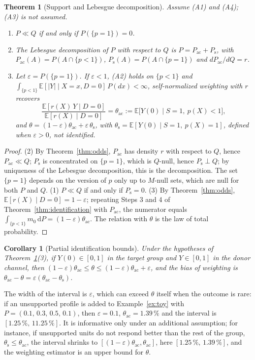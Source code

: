 \documentclass[11pt,a4paper]{article}
\newcommand{\E}{\mathbb{E}}
\newcommand{\dd}{\,\mathrm{d}}
\newcommand{\Pac}{P_{\mathrm{ac}}}
\newcommand{\Ps}{P_{\mathrm{s}}}
\newcommand{\thac}{\theta_{\mathrm{ac}}}
\newcommand{\ths}{\theta_{\mathrm{s}}}
\theoremstyle{plain}
\newtheorem{theorem}{Theorem}
\newtheorem{corollary}{Corollary}
\theoremstyle{definition}
\begin{document}
\begin{theorem}[Support and Lebesgue decomposition]\label{thm:lebesgue}
Assume (A1) and (A4); (A3) is not assumed.
\begin{enumerate}
  \item $P\ll Q$ if and only if $P(\{p=1\})=0$.
  \item The Lebesgue decomposition of $P$ with respect to $Q$ is $P=\Pac+\Ps$, with $\Pac(A)=P(A\cap\{p<1\})$, $\Ps(A)=P(A\cap\{p=1\})$ and $d\Pac/dQ=r$.
  \item Let $\varepsilon=P(\{p=1\})$. If $\varepsilon<1$, (A2) holds on $\{p<1\}$ and $\int_{\{p<1\}}\E[|Y|\mid X=x,D=0]\,P(dx)<\infty$, self-normalized weighting with $r$ recovers
  \[
  \frac{\E[r(X)\,Y\mid D=0]}{\E[r(X)\mid D=0]}=\thac:=\E\bigl[Y(0)\mid S=1,\ p(X)<1\bigr],
  \]
  and $\theta=(1-\varepsilon)\thac+\varepsilon\,\ths$, with $\ths=\E[Y(0)\mid S=1,\ p(X)=1]$, defined when $\varepsilon>0$, not identified.
\end{enumerate}
\end{theorem}
\begin{proof}
(2) By Theorem~\ref{thm:odds}, $\Pac$ has density $r$ with respect to $Q$, hence $\Pac\ll Q$; $\Ps$ is concentrated on $\{p=1\}$, which is $Q$-null, hence $\Ps\perp Q$; by uniqueness of the Lebesgue decomposition, this is the decomposition. The set $\{p=1\}$ depends on the version of $p$ only up to $M$-null sets, which are null for both $P$ and $Q$. (1) $P\ll Q$ if and only if $\Ps=0$. (3) By Theorem~\ref{thm:odds}, $\E[r(X)\mid D=0]=1-\varepsilon$; repeating Steps 3 and 4 of Theorem~\ref{thm:identification} with $\Pac$, the numerator equals $\int_{\{p<1\}}m_0\dd P=(1-\varepsilon)\thac$. The relation with $\theta$ is the law of total probability.
\end{proof}

\begin{corollary}[Partial identification bounds]\label{cor:bounds}
Under the hypotheses of Theorem~\ref{thm:lebesgue}(3), if $Y(0)\in[0,1]$ in the target group and $Y\in[0,1]$ in the donor channel, then $(1-\varepsilon)\thac\le\theta\le(1-\varepsilon)\thac+\varepsilon$, and the bias of weighting is $\thac-\theta=\varepsilon(\thac-\ths)$.
\end{corollary}
The width of the interval is $\varepsilon$, which can exceed $\theta$ itself when the outcome is rare: if an unsupported profile is added to Example~\ref{ex:toy} with $P=(0.1,\,0.3,\,0.5,\,0.1)$, then $\varepsilon=0.1$, $\thac=1.39\,\%$ and the interval is $[1.25\,\%,\,11.25\,\%]$. It is informative only under an additional assumption; for instance, if unsupported units do not respond better than the rest of the group, $\ths\le\thac$, the interval shrinks to $[(1-\varepsilon)\thac,\thac]$, here $[1.25\,\%,\,1.39\,\%]$, and the weighting estimator is an upper bound for $\theta$.
\end{document}
